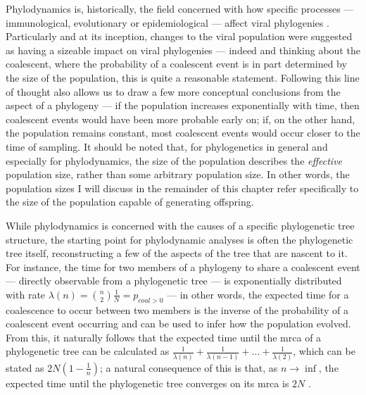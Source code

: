 Phylodynamics is, historically, the field concerned with how specific processes --- immunological, evolutionary or epidemiological --- affect viral phylogenies \cite{Volz2013-ey}. Particularly and at its inception, changes to the viral population were suggested as having a sizeable impact on viral phylogenies \cite{Grenfell2004-ip} --- indeed and thinking about the coalescent, where the probability of a coalescent event is in part determined by the size of the population, this is quite a reasonable statement. Following this line of thought also allows us to draw a few more conceptual conclusions from the aspect of a phylogeny --- if the population increases exponentially with time, then coalescent events would have been more probable early on; if, on the other hand, the population remains constant, most coalescent events would occur closer to the time of sampling. It should be noted that, for phylogenetics in general and especially for phylodynamics, the size of the population describes the \textit{effective} population size, rather than some arbitrary population size. In other words, the population sizes I will discuss in the remainder of this chapter refer specifically to the size of the population capable of generating offspring.

While phylodynamics is concerned with the causes of a specific phylogenetic tree structure, the starting point for phylodynamic analyses is often the phylogenetic tree itself, reconstructing a few of the aspects of the tree that are nascent to it. For instance, the time for two members of a phylogeny to share a coalescent event --- directly observable from a phylogenetic tree --- is exponentially distributed with rate $\lambda(n) = \binom{n}{2}\frac{1}{N} = p_{coal>0}$ --- in other words, the expected time for a coalescence to occur between two members is the inverse of the probability of a coalescent event occurring and can be used to infer how the population evolved. From this, it naturally follows that the expected time until the \ac{mrca} of a phylogenetic tree can be calculated as $\frac{1}{\lambda(n)} + \frac{1}{\lambda(n-1)} + ... + \frac{1}{\lambda(2)}$, which can be stated as $2N(1-\frac{1}{n})$; a natural consequence of this is that, as $n \rightarrow \inf$, the expected time until the phylogenetic tree converges on its \ac{mrca} is $2N$ \cite{Volz2013-ey}. 

